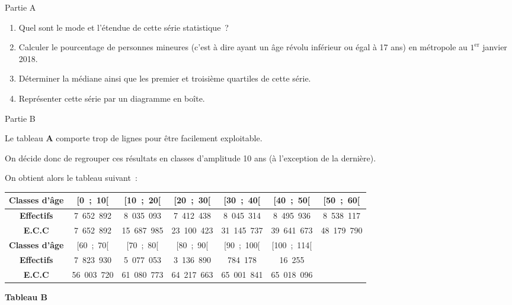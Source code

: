 \begin{center}\begin{h3}Partie A \end{h3}\end{center}
%
\begin{enumerate}
     \item %
     Quel sont le mode et l'étendue de cette série statistique~?
     \item %
     Calculer le pourcentage de personnes mineures (c'est à dire ayant un âge révolu inférieur ou égal à 17 ans) en métropole au $1^\text{er}$ janvier 2018.
     \item %
     Déterminer la médiane ainsi que les premier et troisième quartiles de cette série.
     \item %
     Représenter cette série par un diagramme en boîte.
\end{enumerate}
%
\begin{center}\begin{h3}Partie B \end{h3}\end{center}
\par
Le tableau \textbf{A} comporte trop de lignes pour être facilement exploitable.
\par
On décide donc de regrouper ces résultats en classes d'amplitude 10 ans (à l'exception de la dernière).
\par
On obtient alors le tableau suivant~:
\begin{center}
     \begin{tabular}{|c|c|c|c|c|c|c|}\hline %
        Classes d'âge & [0~;~10[ & [10~;~20[ & [20~;~30[ & [30~;~40[ & [40~;~50[ & [50~;~60[\\ \hline
          \textbf{Effectifs} & 7~652~892  &  8~035~093  &  7~412~438  &  8~045~314  &  8~495~936 &  8~538~117   \\ \hline
          \textbf{E.C.C} & 7~652~892  &  15~687~985  &  23~100~423  &  31~145~737  &  39~641~673  &  48~179~790  \\ \hline
          \textbf{Classes d'âge} &[60~;~70[ & [70~;~80[ & [80~;~90[ & [90~;~100[ & [100~;~114[ \\ \hline
          \textbf{Effectifs} & 7~823~930  &  5~077~053  &  3~136~890  &  784~178  &  16~255 \\ \hline
          \textbf{E.C.C} & 56~003~720  &  61~080~773  &  64~217~663  &  65~001~841  &  65~018~096 \\ \hline
     \end{tabular}
     \textbf{Tableau B}
\end{center}
